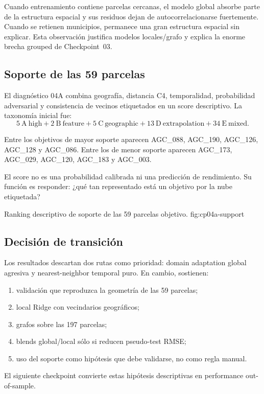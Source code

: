 Cuando entrenamiento contiene parcelas cercanas, el modelo global absorbe parte de la
estructura espacial y sus residuos dejan de autocorrelacionarse fuertemente. Cuando se
retienen municipios, permanece una gran estructura espacial sin explicar. Esta observación
justifica modelos locales/grafo y explica la enorme brecha grouped de Checkpoint~03.

\subsection{Soporte de las 59 parcelas}

El diagnóstico 04A combina geografía, distancia C4, temporalidad, probabilidad adversarial y
consistencia de vecinos etiquetados en un score descriptivo. La taxonomía inicial fue:
\[
5\ \mathrm{A\ high}
+2\ \mathrm{B\ feature}
+5\ \mathrm{C\ geographic}
+13\ \mathrm{D\ extrapolation}
+34\ \mathrm{E\ mixed}.
\]

Entre los objetivos de mayor soporte aparecen AGC\_088, AGC\_190, AGC\_126, AGC\_128 y
AGC\_086. Entre los de menor soporte aparecen AGC\_173, AGC\_029, AGC\_120, AGC\_183 y
AGC\_003.

El score no es una probabilidad calibrada ni una predicción de rendimiento. Su función es
responder: ¿qué tan representado está un objetivo por la nube etiquetada?

{Ranking descriptivo de soporte de las 59 parcelas objetivo.}
{fig:cp04a-support}

\subsection{Decisión de transición}

Los resultados descartan dos rutas como prioridad: domain adaptation global agresiva y
nearest-neighbor temporal puro. En cambio, sostienen:
\begin{enumerate}
\item validación que reproduzca la geometría de las 59 parcelas;
\item local Ridge con vecindarios geográficos;
\item grafos sobre las 197 parcelas;
\item blends global/local sólo si reducen pseudo-test RMSE;
\item uso del soporte como hipótesis que debe validarse, no como regla manual.
\end{enumerate}

El siguiente checkpoint convierte estas hipótesis descriptivas en performance out-of-sample.
